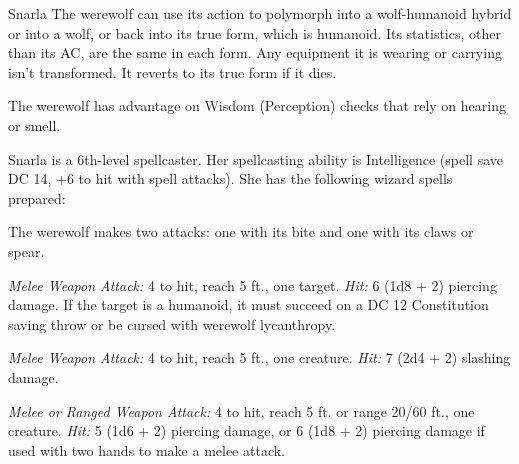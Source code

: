 \documentclass[10pt,a4paper,twoside,bg=print,twocolumn,openany,nodeprecatedcode]{dndbook}
\begin{document}
\begin{DndMonster}[float=t]{Snarla}
\DndMonsterBasics[
armor-class = {11 in humanoid form (12 (natural armor) in wolf and hybrid forms)},
hit-points = {\DndDice{9d8 + 18}},
speed = {30 ft. (40 ft. in wolf form)}
]
\DndMonsterAbilityScores[
 str = 15,
 dex = 13,
 con = 14,
 int = 16,
 wis = 11,
 cha = 10
]
\DndMonsterDetails[
skills = {Perception +3},
damage-immunities = {bludgeoning, piercing, slashing from nonmagical attacks that aren't silvered},
languages = {Common (can't speak in wolf form)},
challenge = 5,
]
The werewolf can use its action to polymorph into a wolf-humanoid hybrid or into a wolf, or back into its true form, which is humanoid. Its statistics, other than its AC, are the same in each form. Any equipment it is wearing or carrying isn't transformed. It reverts to its true form if it dies.

The werewolf has advantage on Wisdom (Perception) checks that rely on hearing or smell.

Snarla is a 6th-level spellcaster. Her spellcasting ability is Intelligence (spell save DC 14, +6 to hit with spell attacks). She has the following wizard spells prepared:
\begin{DndMonsterSpells}
\end{DndMonsterSpells}
The werewolf makes two attacks: one with its bite and one with its claws or spear.

\textsl{Melee Weapon Attack:} 4 to hit, reach 5 ft., one target. \textsl{Hit:} 6 (1d8 + 2) piercing damage. If the target is a humanoid, it must succeed on a DC 12 Constitution saving throw or be cursed with werewolf lycanthropy.

\textsl{Melee Weapon Attack:} 4 to hit, reach 5 ft., one creature. \textsl{Hit:} 7 (2d4 + 2) slashing damage.

\textsl{Melee or Ranged Weapon Attack:} 4 to hit, reach 5 ft. or range 20/60 ft., one creature. \textsl{Hit:} 5 (1d6 + 2) piercing damage, or 6 (1d8 + 2) piercing damage if used with two hands to make a melee attack.

\end{DndMonster}
\end{document}
